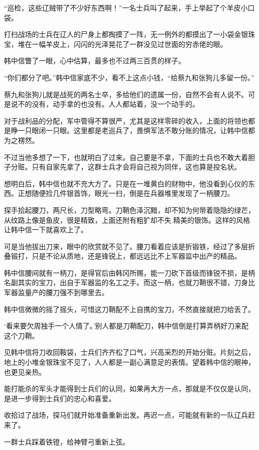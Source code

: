 “巡检，这些辽贼带了不少好东西啊！”一名士兵叫了起来，手上举起了个羊皮小口袋。

打扫战场的士兵在辽人的尸身上都掏摸了一阵，无一例外的都摸出了一小袋金银珠宝，堆在一幅羊皮上，闪闪的光泽晃花了一群没见过世面的穷赤佬的眼。

韩中信瞥了一眼，心中估算，最多也不过两三百贯的样子。

“你们都分了吧。”韩中信家底不少，看不上这点小钱，“给蔡九和张狗儿多留一份。”

蔡九和张狗儿就是战死的两名士卒，多给他们的遗属一份，自然不会有人说不。可是说不的没有，动手拿的也没有。人人都站着，没一个动手的。

对于战利品的分配，军中管得不算很严，尤其是这样零碎的收入，上面的将领也都是睁一只眼闭一只眼。这里都是老巡兵了，畏惧军法不敢分账的情况，让韩中信都为之楞然。

不过当他多想了一下，也就明白了过来。自己要是不拿，下面的士兵也不敢大着胆子分赃。只有自家先拿了，这群士兵才会将自己视为同伴，这也算是投名状。

想明白后，韩中信也就不充大方了。只是在一堆黄白的财物中，他没看到心仪的东西。正想随便捡几件银首饰，眼光一扫，倒是在兵器堆里发现了一柄腰刀。

探手拾起腰刀，两尺长，刀型略弯。刀鞘色泽沉黯，却不知为何带着隐隐的绿芒，从纹路上像是鱼皮，很是精致，上面还附有粗犷却不失.精美的银饰。这样的风格让韩中信一下就喜欢上了。

可是当他拔出刀来，眼中的欣赏就不见了。腰刀看着应该是折锻铁，经过了多层折叠锻打，只是不论从质地，还是锋锐上，都远远比不上军器监中出产的精品。

韩中信腰间就有一柄刀，是得官后由韩冈所赐，能一刀砍下首级而锋锐不损，是柄名副其实的宝刀，出自于军器监的名工之手。而这一柄，也就刀鞘很不错，刀身比军器监量产的腰刀强不到哪里去。

韩中信微微的摇了摇头，可惜这刀鞘配不上自携的宝刀，不然直接就把刀给丢了。

‘看来要欠周独手一个人情了。’别人都是刀鞘配刀，韩中信倒是打算弄柄好刀来配这个刀鞘。

见韩中信将刀收回鞍袋，士兵们齐齐松了口气，兴高采烈的开始分赃。片刻之后，地上的小堆金银珠宝不见了，人人都是一副心满意足的表情。望着韩中信的眼神，也更见亲热。

能打能杀的军头才能得到士兵们的认同，如果再大方一点，那就是不仅仅是认同，是进一步得到士兵们的忠心和喜爱。

收拾过了战场，探马们就开始准备重新出发。再迟一点，可能就有新的一队辽兵赶来了。

一群士兵踩着铁镫，给神臂弓重新上弦。

